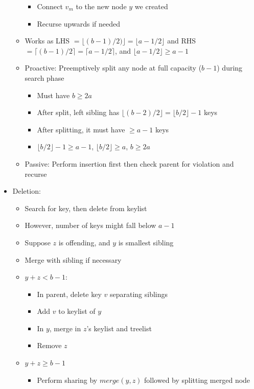 \documentclass[10pt, landscape]{article}
\begin{document}
\begin{multicols*}{4}
\begin{itemize}
\begin{itemize}
\begin{itemize}
            \item Connect $v_m$ to the new node $y$ we created
            \item Recurse upwards if needed
        \end{itemize}
        \item Works as LHS $=\lfloor(b-1)/2)\rfloor=\lfloor a - 1/2 \rfloor$ and RHS $= \lceil (b-1)/2\rceil =\lceil a-1/2 \rceil$, and $\lfloor a-1/2 \rfloor \geq a-1$
        \item Proactive: Preemptively split any node at full capacity ($b-1$) during search phase
        \begin{itemize}
            \item Must have $b \geq 2a$
            \item After split, left sibling has $\lfloor (b-2)/2 \rfloor=\lfloor b/2 \rfloor-1$ keys
            \item After splitting, it must have $\geq a-1$ keys
            \item $\lfloor b/2 \rfloor -1 \geq a-1$, $\lfloor b/2 \rfloor \geq a$, $b \geq 2a$
        \end{itemize}
        \item Passive: Perform insertion first then check parent for violation and recurse
    \end{itemize}
    \item Deletion:
    \begin{itemize}
        \item Search for key, then delete from keylist
        \item However, number of keys might fall below $a-1$
        \item Suppose $z$ is offending, and $y$ is smallest sibling
        \item Merge with sibling if necessary
        \item $y+z < b-1$:
        \begin{itemize}
            \item In parent, delete key $v$ separating siblings
            \item Add $v$ to keylist of $y$
            \item In $y$, merge in $z$'s keylist and treelist
            \item Remove $z$
        \end{itemize}
        \item $y+z \geq b-1$
        \begin{itemize}
            \item Perform sharing by $merge(y, z)$ followed by splitting merged node

\end{itemize}
\end{itemize}
\end{itemize}
\end{multicols*}
\end{document}
